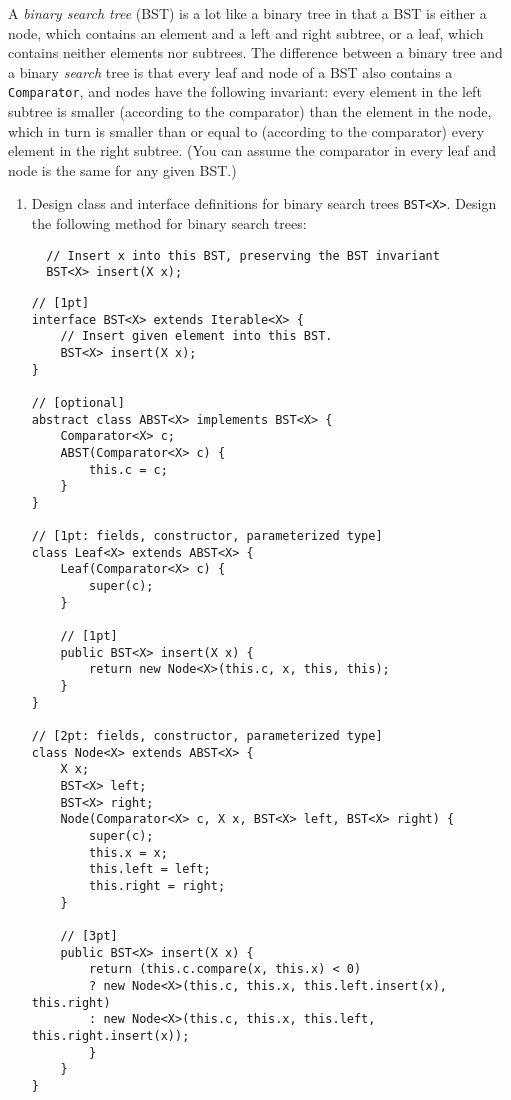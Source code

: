\documentclass[12pt]{article}                   %
\def\pts#1{\marginpar{\footnotesize \raggedright  \fbox{#1 {\sc Points}}}}
\newenvironment{solution}{\color{Red}}{}
\begin{document}
\begin{problem} \pts{20}

A \emph{binary search tree} (BST) is a lot like a binary tree in that
a BST is either a node, which contains an element and a left and right
subtree, or a leaf, which contains neither elements nor subtrees.  The
difference between a binary tree and a binary \emph{search} tree is
that every leaf and node of a BST also contains a \texttt{Comparator},
and nodes have the following invariant: every element in the left
subtree is smaller (according to the comparator) than the element in
the node, which in turn is smaller than or equal to (according to the
comparator) every element in the right subtree.  (You can assume
the comparator in every leaf and node is the same for any given BST.)

\begin{enumerate}
\item Design class and interface definitions for binary search trees
  \texttt{BST<X>}.  Design the following method for binary search
  trees:
  \begin{verbatim}
  // Insert x into this BST, preserving the BST invariant
  BST<X> insert(X x);
\end{verbatim}

\ifrubric

\begin{solution}
\begin{verbatim}
// [1pt]
interface BST<X> extends Iterable<X> {
    // Insert given element into this BST.
    BST<X> insert(X x);
}

// [optional]
abstract class ABST<X> implements BST<X> {
    Comparator<X> c;
    ABST(Comparator<X> c) {
        this.c = c;
    }
}

// [1pt: fields, constructor, parameterized type]
class Leaf<X> extends ABST<X> {
    Leaf(Comparator<X> c) {
        super(c);
    }

    // [1pt]
    public BST<X> insert(X x) {
        return new Node<X>(this.c, x, this, this);
    }
}

// [2pt: fields, constructor, parameterized type]
class Node<X> extends ABST<X> {
    X x;
    BST<X> left;
    BST<X> right;
    Node(Comparator<X> c, X x, BST<X> left, BST<X> right) {
        super(c);
        this.x = x;
        this.left = left;
        this.right = right;
    }

    // [3pt]
    public BST<X> insert(X x) {
        return (this.c.compare(x, this.x) < 0)
        ? new Node<X>(this.c, this.x, this.left.insert(x), this.right)
        : new Node<X>(this.c, this.x, this.left, this.right.insert(x));
        }
    }
}


\end{verbatim}
\end{solution}
\end{enumerate}
\end{problem}
\end{document}
